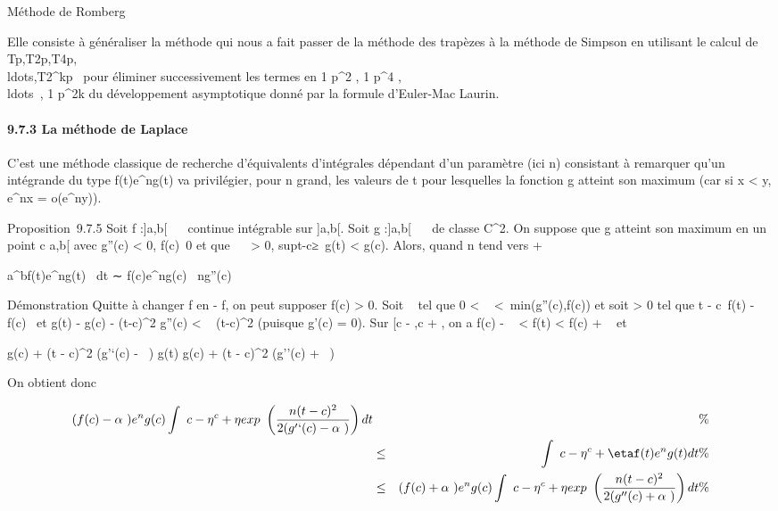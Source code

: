 Méthode de Romberg

Elle consiste à généraliser la méthode qui nous a fait passer de la
méthode des trapèzes à la méthode de Simpson en utilisant le calcul de
Tp,T2p,T4p,\\ldots,T2^kp~
pour éliminer successivement les termes en  1 \over
p^2 , 1 \over p^4
,\\ldots~, 1
\over p^2k du développement asymptotique
donné par la formule d'Euler-Mac Laurin.

\paragraph{9.7.3 La méthode de Laplace}

C'est une méthode classique de recherche d'équivalents d'intégrales
dépendant d'un paramètre (ici n) consistant à remarquer qu'un intégrande
du type f(t)e^ng(t) va privilégier, pour n grand, les valeurs
de t pour lesquelles la fonction g atteint son maximum (car si x
\textless{} y, e^nx = o(e^ny)).

Proposition~9.7.5 Soit f :{]}a,b{[}\rightarrow~ ~ continue intégrable sur
{]}a,b{[}. Soit g :{]}a,b{[}\rightarrow~ ~ de classe C^2. On suppose que
g atteint son maximum en un point c \in{]}a,b{[} avec g''(c) \textless{}
0, f(c)\neq~0 et que \forall~~\eta
\textgreater{} 0,
sup\textbar{}t-c\textbar{}≥\eta~g(t)
\textless{} g(c). Alors, quand n tend vers + \infty~

\int  a^bf(t)e^ng(t)~
dt ∼ f(c)e^ng(c)\pi~
\over n\textbar{}g''(c)\textbar{} 

Démonstration Quitte à changer f en - f, on peut supposer f(c)
\textgreater{} 0. Soit \alpha~ tel que 0 \textless{} \alpha~
\textless{}\
min(\textbar{}g''(c)\textbar{},f(c)) et soit \eta \textgreater{} 0 tel
que \textbar{}t - c\textbar{}\leq \eta \rigtharrow~\textbar{}f(t) - f(c)\textbar{}\leq \alpha~ et
\textbar{}g(t) - g(c) - (t-c)^2 
g''(c)\textbar{} \textless{} \alpha~ (t-c)^2 \over
2 (puisque g'(c) = 0). Sur {[}c - \eta,c + \eta{]}, on a f(c) - \alpha~
\textless{} f(t) \textless{} f(c) + \alpha~ et

g(c) + (t - c)^2  (g'`(c) - \alpha~) \leq
g(t) \leq g(c) + (t - c)^2 \over 2 (g''(c) +
\alpha~)

On obtient donc

\begin{align*} (f(c) -
\alpha~)e^ng(c)\int ~
c-\eta^c+\eta exp~
\left (n (t - c)^2 \over 2
(g'`(c) - \alpha~)\right ) dt&& \%&
\\ & \leq& \int ~
c-\eta^c+\etaf(t)e^ng(t) dt \%&
\\ & \leq& (f(c) +
\alpha~)e^ng(c)\int ~
c-\eta^c+\eta exp~
\left (n (t - c)^2 \over 2
(g''(c) + \alpha~)\right ) dt\%&
\\ \end{align*}

